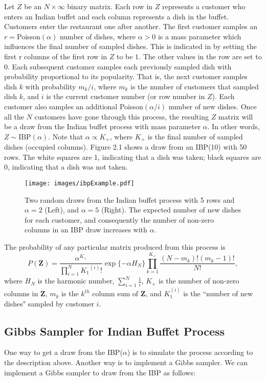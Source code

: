 \documentclass[mathserif]{article}
\def\beginmyfig{\begin{figure}[htbp]\begin{center}}
\def\endmyfig{\end{center}\end{figure}}
\def\prodl#1#2#3{\prod\limits_{#1=#2}^{#3}}
\def\suml#1#2#3{\sum\limits_{#1=#2}^{#3}}
\def\ds{\displaystyle}
\begin{document}
\noindent
Let $Z$ be an $N \times \infty$ binary matrix. Each row in $Z$ represents a
customer who enters an Indian buffet and each column represents a dish in the
buffet. Customers enter the restaurant one after another. The first customer
samples an $r=$Poisson$(\alpha)$ number of dishes, where $\alpha > 0$ is a mass
parameter which influences the final number of sampled dishes. This is
indicated in by setting the first r columns of the first row in $Z$ to be $1$.
The other values in the row are set to $0$. Each subsequent customer samples
each previously sampled dish with probability proportional to its popularity.
That is, the next customer samples dish $k$ with probability $m_k/i$,
where $m_k$ is the number of customers that sampled dish $k$, and $i$ is the
current customer number (or row number in $Z$). Each customer also samples an
additional Poisson$(\alpha/i)$ number of new dishes. Once all the $N$ customers
have gone through this process, the resulting $Z$ matrix will be a draw from
the Indian buffet process with mass parameter $\alpha$. In other words, $Z \sim
\text{IBP}(\alpha)$. Note that $\alpha \propto K_+$, where $K_+$ is the final
number of sampled dishes (occupied columns). Figure 2.1 shows a draw from an
IBP(10) with 50 rows. The white squares are 1, indicating that a dish was
taken; black squares are 0, indicating that a dish was not taken. \\
\beginmyfig
  \texttt{[image: images/ibpExample.pdf]}
  \caption{Two random draws from the Indian buffet process with 5 rows
           and $\alpha=2$ (Left), and $\alpha=5$ (Right). The expected number of new
           dishes for each customer, and consequently the number of non-zero columns in an
           IBP draw increases with $\alpha$.}
\endmyfig

\noindent
The probability of any particular matrix produced from this process is
\begin{equation}
  P(\bm{Z}) = \frac{\alpha^{K_+}}{\prodl{i}{1}{N} {K_1}^{(i)}!} 
              \exp\{-\alpha H_N\}\prodl{k}{1}{K_+}
              \frac{(N-m_k)!(m_k-1)!}{N!},
\end{equation}
where $H_N$ is the harmonic number, $\suml{i}{1}{N}\ds\frac{1}{i}$, $K_+$ is
the number of non-zero columns in $\bm Z$, $m_k$ is the $k^{th}$ column sum of
$\bm Z$, and $K_1^{(i)}$ is the ``number of new dishes" sampled by customer $i$.\\


\subsection*{Gibbs Sampler for Indian Buffet Process}
One way to get a draw from the IBP($\alpha$) is to simulate the process
according to the description above. Another way is to implement a Gibbs
sampler. We can implement a Gibbs sampler to draw from the IBP as follows:
\end{document}

